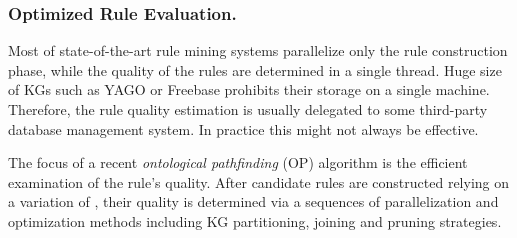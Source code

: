 \subsubsection{Optimized Rule Evaluation.}
Most of state-of-the-art rule mining systems parallelize only the rule construction phase, while the quality of the rules are determined in a single thread. Huge size of KGs such as YAGO or Freebase %
prohibits their storage on %
a single machine. Therefore, %
the rule quality estimation %
is usually delegated to some third-party database management system.
In practice this might not always be effective. %

The focus of a recent %
 \emph{ontological pathfinding} (OP) \cite{op} algorithm is %
the efficient examination of the rule's quality. %
After candidate rules are constructed relying on a variation of \cite{DBLP:conf/aaai/RichardsM92}, their quality is determined via a sequences of parallelization and optimization methods including KG partitioning, joining and pruning strategies.




